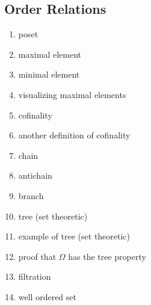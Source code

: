 \documentclass[12pt]{article}
\begin{document}
\begin{multicols}{2}
\subsection{Order Relations}
\begin{enumerate}
\item poset
\item maximal element 
\item minimal element
\item visualizing maximal elements 
\item cofinality
\item another definition of cofinality
\item chain
\item antichain
\item branch
\item tree (set theoretic)
\item example of tree (set theoretic)
\item proof that $\Omega$ has the tree property
\item filtration
\item well ordered set
\end{enumerate}


\end{multicols}
\end{document}
